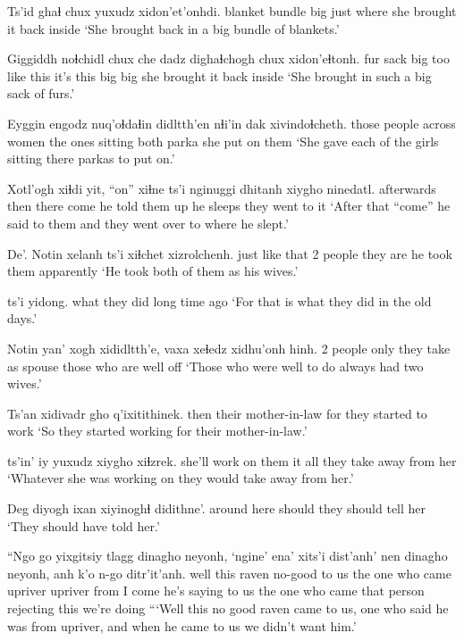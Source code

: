 \documentclass[12pt]{article}
\begin{document}
\gll Ts'id ghaɬ chux yuxudz xidon'et'onhdi.
blanket bundle big just {where she brought it back inside} 
\glt `She brought back in a big bundle of blankets.'
\glend

\gll Giggiddh noɬchidl chux che dadz dighaɬchogh chux xidon'eɬtonh.
fur sack big too {like this} {it's this big} big {she brought it back inside}
\glt `She brought in such a big sack of furs.'
\glend

\gll Eyggin engodz nuq'oɬdaɬin didltth'en nɬi'in dak xivindoɬcheth.
{those people} across women {the ones sitting} both parka {she put on them}
\glt `She gave each of the girls sitting there parkas to put on.'
\glend

\gll Xotl'ogh xiɬdi yit, ``on'' xiɬne ts'i nginuggi dhitanh {xiygho ninedatl. }
afterwards then there come {he told them} {} up {he sleeps} {they went to it}
\glt `After that ``come'' he said to them and they went over to where he slept.'
\glend

\gll De'. Notin xelanh ts'i xiɬchet xizrolchenh.
{just like that} {2 people} {they are} {} {he took them} apparently
\glt `He took both of them as his wives.'
\glend

 ts'i yidong.
{what they did} {} {long time ago}
\glt `For that is what they did in the old days.'
\glend

\gll Notin yan' {xogh xididltth'e,} {vaxa xeɬedz xidhu'onh hinh}.
{2 people} only {they take as spouse} {those who are well off}
\glt `Those who were well to do always had two wives.'
\glend

\gll Ts'an xidivadr gho q'ixitithinek.
then {their mother-in-law} for {they started to work}
\glt `So they started working for their mother-in-law.'
\glend

 ts'in' iy yuxudz {xiygho xiɬzrek.}
{she'll work on them} {} it all {they take away from her}
\glt `Whatever she was working on they would take away from her.'
\glend

\gll Deg diyogh ixan {xiyinoghɬ didithne'.}
{around here} should {} {they should tell her}
\glt `They should have told her.'
\glend

\gll ``Ngo go yixgitsiy tlagg dinagho neyonh, `ngine' ena' xits'i dist'anh' nen dinagho neyonh, anh k'o n-go ditr'it'anh.
well this raven no-good {to us} {the one who came} upriver upriver from {I come} {he's saying} {to us} {the one who came} {that person} rejecting this {we're doing} 
\glt ```Well this no good raven came to us, one who said he was from upriver, and when he came to us we didn't want him.'
\glend
\end{document}

